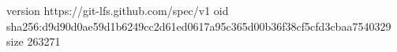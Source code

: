 version https://git-lfs.github.com/spec/v1
oid sha256:d9d90d0ae59d1b6249cc2d61ed0617a95c365d00b36f38cf5cfd3cbaa7540329
size 263271
